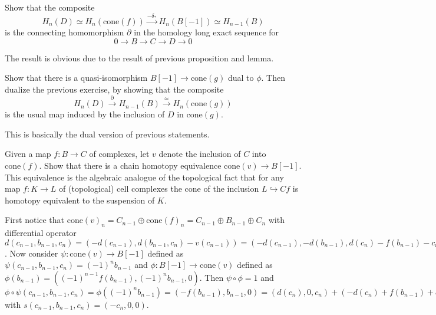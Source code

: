 \begin{exer} Show that the composite
\begin{equation}
H_n(D)\simeq H_n(\textrm{cone}(f))\xrightarrow{-\delta_*}H_n(B[-1])\simeq H_{n-1}(B)
\end{equation}
is the connecting homomorphism $\partial$ in the homology long exact sequence for
\begin{equation}
0\rightarrow B\rightarrow C\rightarrow D\rightarrow 0
\end{equation}
\end{exer}
\begin{solution} The result is obvious due to the result of previous proposition and lemma.
\end{solution}

\begin{exer} Show that there is a quasi-isomorphism $B[-1]\rightarrow \textrm{cone}(g)$ dual to $\phi$. Then dualize the previous exercise, by showing that the composite
\begin{equation}
H_n(D)\xrightarrow{\partial} H_{n-1}(B)\xrightarrow{\simeq} H_n(\textrm{cone}(g))
\end{equation}
is the usual map induced by the inclusion of $D$ in $\textrm{cone}(g)$.
\end{exer}
\begin{solution} This is basically the dual version of previous statements.	
\end{solution}

\begin{exer} Given a map $f:B\rightarrow C$ of complexes, let $v$ denote the inclusion of $C$ into $\textrm{cone}(f)$. Show that there is a chain homotopy equivalence $\textrm{cone}(v)\rightarrow B[-1]$. This equivalence is the algebraic analogue of the topological fact that for any map $f:K\rightarrow L$ of (topological) cell complexes the cone of the inclusion $L\hookrightarrow Cf$ is homotopy equivalent to the suspension of $K$.
\end{exer}
\begin{solution} First notice that $\textrm{cone}(v)_n=C_{n-1}\oplus \textrm{cone}(f)_n=C_{n-1}\oplus B_{n-1}\oplus C_n$ with differential operator $d(c_{n-1},b_{n-1},c_n)=(-d(c_{n-1}),d(b_{n-1},c_n)-v(c_{n-1}))=(-d(c_{n-1}),-d(b_{n-1}),d(c_n)-f(b_{n-1})-c_{n-1})$. Now consider $\psi:\textrm{cone}(v)\rightarrow B[-1]$ defined as $\psi(c_{n-1},b_{n-1},c_n)=(-1)^n b_{n-1}$ and $\phi:B[-1]\rightarrow \textrm{cone}(v)$ defined as $\phi(b_{n-1})=((-1)^{n-1} f(b_{n-1}), (-1)^n b_{n-1},0)$. Then $\psi\circ \phi=1$ and $\phi\circ \psi(c_{n-1},b_{n-1},c_n)=\phi((-1)^n b_{n-1})=(-f(b_{n-1}),b_{n-1},0)=(d(c_n),0,c_n)+(-d(c_n)+f(b_{n-1})+c_{n-1},0,0)=d(-c_n,0,0)+s(-d(c_{n-1}),-d(b_{n-1}),d(c_n)-f(b_{n-1})-c_{n-1})=(d\circ s+s\circ d)(c_{n-1},b_{n-1},c_n)$ with $s(c_{n-1},b_{n-1},c_n)=(-c_n,0,0)$.
\end{solution}

